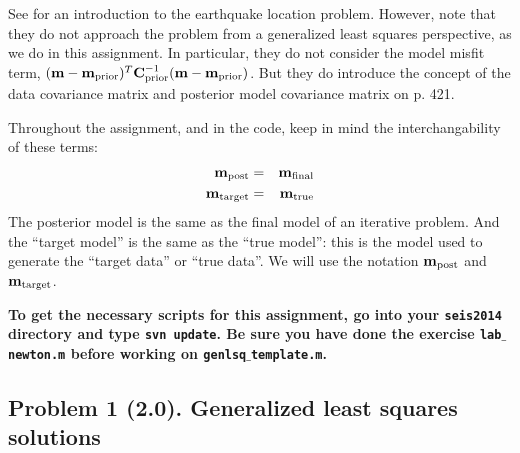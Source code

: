 \documentclass[11pt,titlepage,fleqn]{article}
\begin{document}
See \citet[][Chapter 7]{SteinWysession} for an introduction to the earthquake location problem. However, note that they do not approach the problem from a generalized least squares perspective, as we do in this assignment. In particular, they do not consider the model misfit term, $(\mbox{${\bf m}$}-\mbox{${\bf m}$}_{\rm prior})^T \mbox{${\bf C}$}_{\rm prior}^{-1} (\mbox{${\bf m}$}-\mbox{${\bf m}$}_{\rm prior})$. But they do introduce the concept of the data covariance matrix and posterior model covariance matrix on p. 421.

Throughout the assignment, and in the code, keep in mind the interchangability of these terms:
%
\begin{eqnarray*}
\mbox{${\bf m}$}_{\rm post} &=& \mbox{${\bf m}$}_{\rm final}
\\
\mbox{${\bf m}$}_{\rm target} &=& \mbox{${\bf m}$}_{\rm true}
\end{eqnarray*}
%
The posterior model is the same as the final model of an iterative problem. And the ``target model'' is the same as the ``true model'': this is the model used to generate the ``target data'' or ``true data''. We will use the notation $\mbox{${\bf m}$}_{\rm post}$ and $\mbox{${\bf m}$}_{\rm target}$.

\bigskip\noindent
{\bf To get the necessary scripts for this assignment, go into your {\tt seis2014} directory and type {\tt svn update}. Be sure you have done the exercise {\tt lab$\_$newton.m} before working on {\tt genlsq$\_$template.m}.}


\subsection*{Problem 1 (2.0). Generalized least squares solutions}
\end{document}
